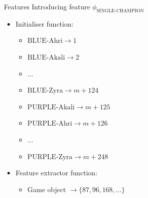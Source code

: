 \begin{frame}{Features}
Introducing feature $\phi_\text{SINGLE-CHAMPION}$
\begin{itemize}
\item Initialiser function:
	\begin{itemize}
	\item $\text{BLUE-Ahri} \rightarrow 1$
	\item $\text{BLUE-Akali} \rightarrow 2$
	\item ...
	\item $\text{BLUE-Zyra} \rightarrow m+124$
	\item $\text{PURPLE-Akali} \rightarrow m+125$
	\item $\text{PURPLE-Ahri} \rightarrow m+126$
	\item ...
	\item $\text{PURPLE-Zyra}\rightarrow m+248$
	\end{itemize}
\item Feature extractor function:  
	\begin{itemize}
	\item Game object $\rightarrow \{87, 96, 168, ...\}$
	\end{itemize}
\end{itemize}
\end{frame}